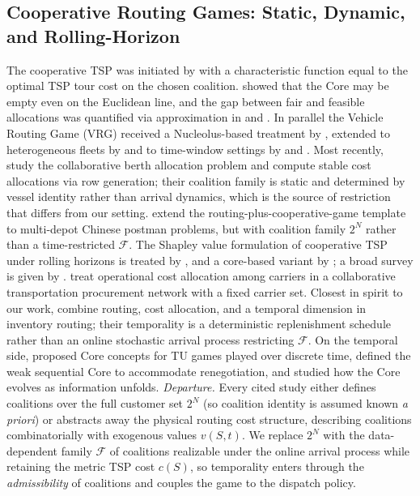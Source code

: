 \documentclass[11pt]{article}
\theoremstyle{plain}
\theoremstyle{definition}
\theoremstyle{remark}
\newcommand{\F}{\mathcal{F}}
\begin{document}
\subsection{Cooperative Routing Games: Static, Dynamic, and Rolling-Horizon}
The cooperative TSP was initiated by \citet{potters1992tsg} with a characteristic function equal to the optimal TSP tour cost on the chosen coalition. \citet{tamir1989core} showed that the Core may be empty even on the Euclidean line, and the gap between fair and feasible allocations was quantified via approximation in \citet{faigle1998approximate} and \citet{blaser2008metric}. In parallel the Vehicle Routing Game (VRG) received a Nucleolus-based treatment by \citet{gothe1996vrg}, extended to heterogeneous fleets by \citet{engevall2004heterogeneous} and to time-window settings by \citet{tae2020vrgtw} and \citet{arroyo2024vrptw}. Most recently, \citet{lyu2025collaborative} study the collaborative berth allocation problem and compute stable cost allocations via row generation; their coalition family is static and determined by vessel identity rather than arrival dynamics, which is the source of restriction that differs from our setting. \citet{platz2015multidepot} extend the routing-plus-cooperative-game template to multi-depot Chinese postman problems, but with coalition family $2^N$ rather than a time-restricted $\F$. The Shapley value formulation of cooperative TSP under rolling horizons is treated by \citet{kimms2016rolling}, and a core-based variant by \citet{kimms2016core}; a broad survey is given by \citet{guajardo2016review}. \citet{ozener2008allocating} treat operational cost allocation among carriers in a collaborative transportation procurement network with a fixed carrier set. Closest in spirit to our work, \citet{ozener2013allocating} combine routing, cost allocation, and a temporal dimension in inventory routing; their temporality is a deterministic replenishment schedule rather than an online stochastic arrival process restricting $\F$. On the temporal side, \citet{kranich2005dynamic} proposed Core concepts for TU games played over discrete time, \citet{habis2010weak} defined the weak sequential Core to accommodate renegotiation, and \citet{lehrer2013dynamic} studied how the Core evolves as information unfolds. \emph{Departure.} Every cited study either defines coalitions over the full customer set $2^N$ (so coalition identity is assumed known \emph{a priori}) or abstracts away the physical routing cost structure, describing coalitions combinatorially with exogenous values $v(S,t)$. We replace $2^N$ with the data-dependent family $\F$ of coalitions realizable under the online arrival process while retaining the metric TSP cost $c(S)$, so temporality enters through the \emph{admissibility} of coalitions and couples the game to the dispatch policy.
\end{document}
